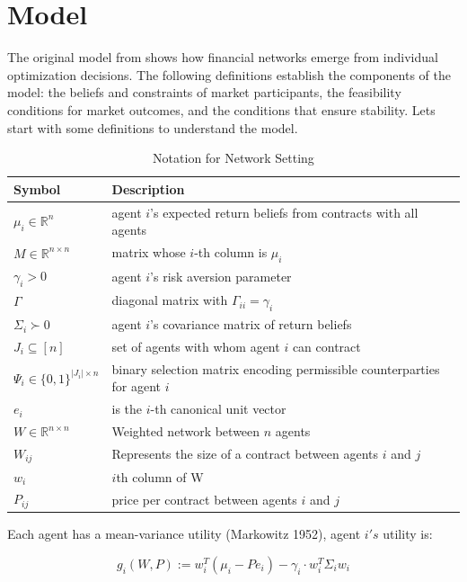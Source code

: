 \chapter{Model} \label{capMethods}

The original model from \cite{jalan_incentive-aware_2024} shows how financial networks emerge from individual optimization decisions. The following definitions establish the components of the model: the beliefs and constraints of market participants, the feasibility conditions for market outcomes, and the conditions that ensure stability. Lets start with some definitions to understand the model.

\begin{table}[H]
\centering
\caption{Notation for Network Setting}
\label{tab:network_notation}
\begin{tabular}{ll}
\hline
\textbf{Symbol} & \textbf{Description} \\
\hline
$\mu_i \in \mathbb{R}^n$ & agent $i$'s expected return beliefs from contracts with all agents \\
$M \in \mathbb{R}^{n \times n}$ & matrix whose $i$-th column is $\mu_i$ \\
$\gamma_i > 0$ & agent $i$'s risk aversion parameter \\
$\Gamma$ & diagonal matrix with $\Gamma_{ii} = \gamma_i$ \\
$\Sigma_i \succ 0$ & agent $i$'s covariance matrix of return beliefs \\
$J_i \subseteq [n]$ & set of agents with whom agent $i$ can contract \\
$\Psi_i \in \{0,1\}^{|J_i| \times n}$ & binary selection matrix encoding permissible counterparties for agent $i$ \\
$e_i$ & is the $i$-th canonical unit vector \\
$W \in \mathbb{R}^{n\times n}$ & Weighted network between $n$ agents \\
$W_{ij}$  & Represents the size of a contract between
agents $i$ and $j$ \\
$w_{i}$ & $i$th column of W \\
$P_{ij}$ & price per contract between agents $i$ and $j$\\
\hline
\end{tabular}
\end{table}


Each agent has a mean-variance utility (Markowitz 1952), agent $i's$ utility is:

\begin{equation}
\label{eq:original_utility}
g_i(W, P) := w_i^T(\mu_i-Pe_i)-\gamma_i \cdot w_i^T \Sigma_iw_i   
\end{equation}


